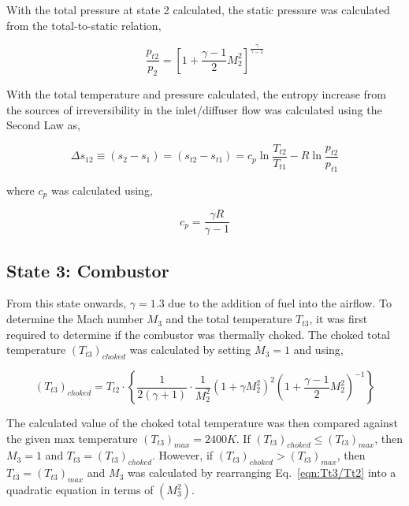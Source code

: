 \documentclass[conf]{new-aiaa} %
\begin{document}
With the total pressure at state 2 calculated, the static pressure was calculated from the total-to-static relation,

\begin{equation}
    \label{eqn:p2}
    \frac{p_{t2}}{p_2}=\left[1+\frac{\gamma-1}{2}M_2^2\right]^{\frac{\gamma}{\gamma-1}}
\end{equation}

With the total temperature and pressure calculated, the entropy increase from the sources of irreversibility in the inlet/diffuser flow was calculated using the Second Law as,

\begin{equation}
    \label{eqn:dels12}
    \Delta s_{12}\equiv \left(s_2-s_1\right)=\left(s_{t2}-s_{t1}\right)=c_p \ln\frac{T_{t2}}{T_{t1}}-R\ln\frac{p_{t2}}{p_{t1}}
\end{equation}

where $c_p$ was calculated using,

\begin{equation}
    \label{eqn:cp}
    c_p=\frac{\gamma R}{\gamma-1}
\end{equation}

\subsection{State 3: Combustor}
From this state onwards, $\gamma=1.3$ due to the addition of fuel into the airflow. To determine the Mach number $M_3$ and the total temperature $T_{t3}$, it was first required to determine if the combustor was thermally choked. The choked total temperature $\left(T_{t3}\right)_{choked}$ was calculated by setting $M_3=1$ and using,

\begin{equation}
    \label{eqn:Tt3choked}
    \left(T_{t3}\right)_{choked}=T_{t2}\cdot\left\{\frac{1}{2(\gamma+1)}\cdot\frac{1}{M_2^2}\left(1+\gamma M_2^2\right)^2\left(1+\frac{\gamma-1}{2}M_2^2\right)^{-1}\right\}
\end{equation}

The calculated value of the choked total temperature was then compared against the given max temperature $\left(T_{t3}\right)_{max}=2400K$. If $\left(T_{t3}\right)_{choked}\leq\left(T_{t3}\right)_{max}$, then $M_3=1$ and $T_{t3}=\left(T_{t3}\right)_{choked}$. However, if $\left(T_{t3}\right)_{choked}>\left(T_{t3}\right)_{max}$, then $T_{t3}=\left(T_{t3}\right)_{max}$ and $M_3$ was calculated by rearranging Eq.~\eqref{eqn:Tt3/Tt2} into a quadratic equation in terms of $\left(M_3^2\right)$.
\end{document}
